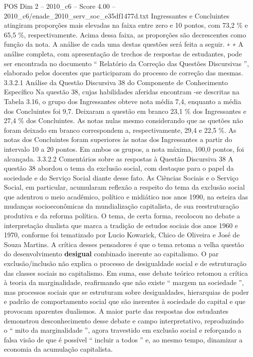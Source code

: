 \begin{textsample}{POS Dim 2 – 2010\_c6 – Score 4.00 – 2010\_c6/enade\_2010\_serv\_soc\_e35df1477d.txt}
Ingressantes e Concluintes atingiram proporções mais elevadas na faixa entre zero e 10 pontos, com 73,2 \% e 65,5 \%, respectivamente.
Acima dessa faixa, as proporções são decrescentes como função da nota.
A análise de cada uma destas questões será feita a seguir. ∗ ∗ A análise completa, com apresentação de trechos de respostas de estudantes, pode ser encontrada no documento “ Relatório da Correção das Questões Discursivas ”, elaborado pelos docentes que participaram do processo de correção das mesmas. 3.3.2.1 Análise da Questão Discursiva 38 do Componente de Conhecimento Específico Na questão 38, cujas habilidades aferidas encontram -se descritas na Tabela 3.16, o grupo dos Ingressantes obteve nota média 7,4, enquanto a média dos Concluintes foi 9,7.
Deixaram a questão em branco 23,1 \% dos Ingressantes e 27,4 \% dos Concluintes.
As notas nulas mesmo considerando que as quetões não foram deixado em branco correspondem a, respectivamente, 29,4 e 22,5 \%.
As notas dos Concluintes foram superiores às notas dos Ingressantes a partir do intervalo 10 a 20 pontos.
Em ambos os grupos, a nota máxima, 100,0 pontos, foi alcançada. 3.3.2.2 Comentários sobre as respostas à Questão Discursiva 38 A questão 38 abordou o tema da exclusão social, com destaque para o papel da sociedade e do Serviço Social diante desse fato.
As Ciências Sociais e o Serviço Social, em particular, acumularam reflexão a respeito do tema da exclusão social que adentrou o meio acadêmico, político e midiático nos anos 1990, na esteira das mudanças socioeconômicas da mundialização capitalista, de sua reestruturação produtiva e da reforma política.
O tema, de certa forma, recolocou no debate a interpretação dualista que marca a tradição de estudos sociais dos anos 1960 e 1970, conforme foi tematizado por Lucio Kowarick, Chico de Oliveira e José de Souza Martins.
A crítica desses pensadores é que o tema retoma a velha questão do desenvolvimento \textbf{desigual} combinado inerente ao capitalismo.
O par exclusão/inclusão não explica o processo de desigualdade social e de estruturação das classes sociais no capitalismo.
Em suma, esse debate teórico retomou a crítica à teoria da marginalidade, reafirmando que não existe “ margem na sociedade ”, mas processos sociais que se estruturam sobre desigualdades, hierarquias de poder e padrão de comportamento social que são inerentes à sociedade do capital e que provocam aparentes dualismos.
A maior parte das respostas dos estudantes demonstrou desconhecimento desse debate e campo interpretativo, reproduzindo o “ mito da marginalidade ”, agora travestido em exclusão social e reforçando a falsa visão de que é possível “ incluir a todos ” e, ao mesmo tempo, dinamizar a economia da acumulação capitalista.

\end{textsample}
